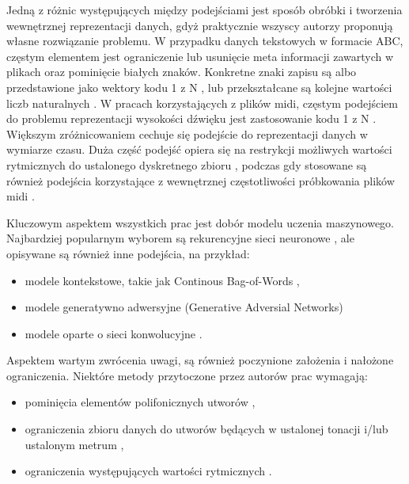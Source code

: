 {{    Jedną z różnic występujących między podejściami jest sposób obróbki i tworzenia
    wewnętrznej reprezentacji danych, gdyż praktycznie wszyscy autorzy 
    proponują własne rozwiązanie problemu. 
    W przypadku danych tekstowych w formacie ABC, częstym elementem jest ograniczenie
    lub usunięcie meta informacji zawartych w plikach \cite{Agarwala2017MusicCU, Sturm2015FolkMS} oraz pominięcie białych znaków.
    Konkretne znaki zapisu są albo przedstawione jako wektory kodu 1 z N \cite{Sturm2015FolkMS}, 
    lub przekształcane są kolejne wartości liczb naturalnych \cite{Agarwala2017MusicCU}.
    W pracach korzystających z plików midi, częstym podejściem do problemu reprezentacji wysokości
    dźwięku jest zastosowanie kodu 1 z N \cite{Yang2017MidiNetAC}. Większym zróżnicowaniem cechuje się podejście
    do reprezentacji danych w wymiarze czasu. Duża część podejść opiera się na restrykcji możliwych
    wartości rytmicznych do ustalonego dyskretnego zbioru \cite{Hadjeres2016DeepBachAS, Wu2017AHR}, 
    podczas gdy stosowane są również podejścia korzystające z wewnętrznej częstotliwości próbkowania 
    plików midi \cite{Mogren2016CRNNGANCR}.

    Kluczowym aspektem wszystkich prac jest dobór modelu uczenia maszynowego.
    Najbardziej popularnym wyborem są rekurencyjne sieci neuronowe \cite{Agarwala2017MusicCU, Sturm2015FolkMS, Souza2018DeepNN, Mogren2016CRNNGANCR},
    ale opisywane są również inne podejścia, na przykład:
    \begin{itemize}
      \item modele kontekstowe, takie jak Continous Bag-of-Words \cite{Agarwala2017MusicCU},
      \item modele generatywno adwersyjne (Generative Adversial Networks) \cite{Agarwala2017MusicCU, Mogren2016CRNNGANCR}
      \item modele oparte o sieci konwolucyjne \cite{Yang2017MidiNetAC, Oord2016WaveNetAG}.
    \end{itemize}

    Aspektem wartym zwrócenia uwagi, są również poczynione założenia i nałożone
    ograniczenia. Niektóre metody przytoczone przez autorów prac wymagają:
    \begin{itemize}
      \item pominięcia elementów polifonicznych utworów \cite{Sturm2015FolkMS, Hadjeres2016DeepBachAS},
      \item ograniczenia zbioru danych do utworów będących w 
      ustalonej tonacji i/lub ustalonym metrum \cite{Sturm2015FolkMS, Wu2017AHR},
      \item ograniczenia występujących wartości rytmicznych \cite{Hadjeres2016DeepBachAS}.
    \end{itemize}
  }

}

